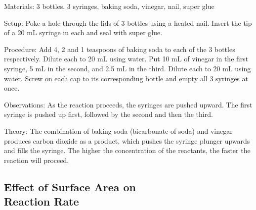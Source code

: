 \begin{multicols}{2}

\begin{description*}
\item[Materials:]{3 bottles, 3 syringes, baking soda, vinegar, nail, super glue}
\item[Setup:]{Poke a hole through the lids of 3 bottles using a heated nail. Insert the tip of a 20 mL syringe in each and seal with super glue.}
\item[Procedure:]{Add 4, 2 and 1 teaspoons of baking soda to each of the 3 bottles respectively. Dilute each to 20 mL using water. Put 10 mL of vinegar in the first syringe, 5 mL in the second, and 2.5 mL in the third. Dilute each to 20 mL using water. Screw on each cap to its corresponding bottle and empty all 3 syringes at once.}
\item[Observations:]{As the reaction proceeds, the syringes are pushed upward. The first syringe is pushed up first, followed by the second and then the third.}
\item[Theory:]{The combination of baking soda (bicarbonate of soda) and vinegar produces carbon dioxide as a product, which pushes the syringe plunger upwards and fills the syringe. The higher the concentration of the reactants, the faster the reaction will proceed.}
\end{description*}

\columnbreak

\subsection[Effect of Surface Area on Reaction Rate]{Effect of Surface Area on \hfill \\ Reaction Rate}



\end{multicols}
